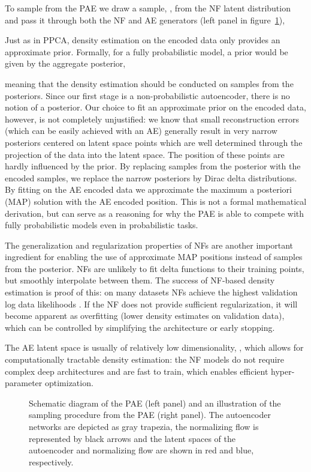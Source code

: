 \documentclass[10pt]{article} \usepackage[accepted]{tmlr}
\begin{document}
To sample from the PAE we draw a sample, , from the NF latent distribution and pass it through both the NF and AE generators (left panel in figure~\ref{fig:illu}), 


Just as in PPCA, density estimation on the encoded data only provides an approximate prior.
Formally, for a fully probabilistic model, a prior would be given by the aggregate posterior,

meaning that the density estimation should be conducted on samples from the posteriors.
Since our first stage is a non-probabilistic autoencoder, there is no notion of a posterior. Our choice to fit an approximate prior on the encoded data, however, is not completely unjustified: we know that small reconstruction errors (which can be easily achieved with an AE) generally result in very narrow posteriors centered on latent space points which are well determined through the projection of the data into the latent space. The position of these points are hardly influenced by the prior. 
By replacing samples from the posterior with the encoded samples, we replace the narrow posteriors by Dirac delta distributions. By fitting on the AE encoded data we approximate the maximum a posteriori (MAP) solution with the AE encoded position. This is not a formal mathematical derivation, but can serve as a reasoning for why the PAE is able to compete with fully probabilistic models even in probabilistic tasks.

The generalization and regularization properties of NFs are another important ingredient for enabling the use of approximate MAP positions instead of samples from the posterior. NFs are unlikely to fit delta functions to their training points, but smoothly interpolate between them. The success of NF-based density estimation is proof of this: on many datasets NFs achieve the highest validation log data likelihoods \citep{durkan2019neural}. If the NF does not provide sufficient regularization, it will become apparent as overfitting (lower density estimates on validation data), which can be controlled by simplifying the architecture or early stopping. 

The AE latent space is usually of relatively low dimensionality, , which allows for computationally tractable density estimation: the NF models do not require complex deep architectures and are fast to train, which enables efficient hyper-parameter optimization.

\begin{figure}
\caption{\label{fig:illu} Schematic diagram of the PAE (left panel) and an illustration of the sampling procedure from the PAE (right panel). The autoencoder networks are depicted as gray trapezia, the normalizing flow is represented by black arrows and the latent spaces of the autoencoder and normalizing flow are shown in red and blue, respectively.}
\end{figure}
\end{document}
